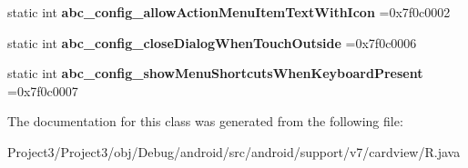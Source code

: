 \begin{DoxyCompactItemize}
static int {\bfseries abc\+\_\+config\+\_\+allow\+Action\+Menu\+Item\+Text\+With\+Icon} =0x7f0c0002
\item 
\mbox{\label{classandroid_1_1support_1_1v7_1_1cardview_1_1R_1_1bool_a18b5741715753c0a30f0d59efdb6ead9}} 
static int {\bfseries abc\+\_\+config\+\_\+close\+Dialog\+When\+Touch\+Outside} =0x7f0c0006
\item 
\mbox{\label{classandroid_1_1support_1_1v7_1_1cardview_1_1R_1_1bool_a9fcb756e115976b01b49eff52bc6f1f0}} 
static int {\bfseries abc\+\_\+config\+\_\+show\+Menu\+Shortcuts\+When\+Keyboard\+Present} =0x7f0c0007
\end{DoxyCompactItemize}


The documentation for this class was generated from the following file\+:\begin{DoxyCompactItemize}
\item 
Project3/\+Project3/obj/\+Debug/android/src/android/support/v7/cardview/R.\+java\end{DoxyCompactItemize}
